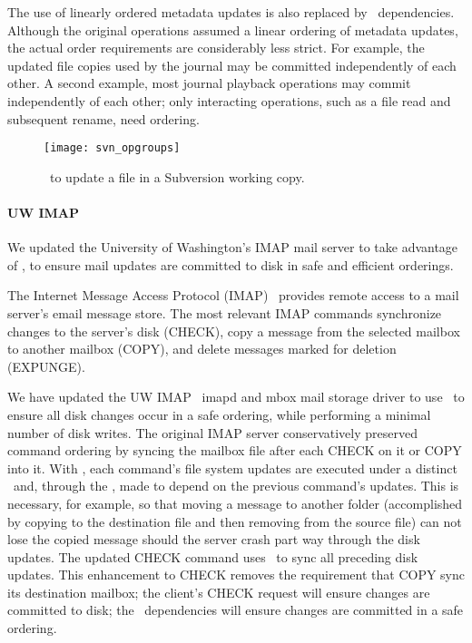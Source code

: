 The use of linearly ordered metadata updates is also replaced by
\opgroup\ dependencies.
%
Although the original operations assumed a linear ordering of metadata
updates, the actual order requirements are considerably less strict.
%
For example, the updated file copies used by the journal may be
committed independently of each other.
%
A second example, most journal playback operations may commit
independently of each other; only interacting operations, such as a
file read and subsequent rename, need ordering.

\begin{figure}[htb]
  \centering
  \texttt{[image: svn\_opgroups]}
  \caption{\Opgroups\ to update a file in a Subversion working copy.}
  \label{fig:svn-order}
\end{figure}

\paragraph{UW IMAP}
\label{sec:opgroup:uwimap}

We updated the University of Washington's IMAP mail server to take
advantage of \opgroups, to ensure mail updates are committed to disk
in safe and efficient orderings.

The Internet Message Access Protocol (IMAP)~\cite{rfc3501} provides
remote access to a mail server's email message store.
%
The most relevant IMAP commands synchronize changes to the server's
disk (CHECK), copy a message from the selected mailbox to another
mailbox (COPY), and delete messages marked for deletion (EXPUNGE).

We have updated the UW IMAP~\cite{uwimap} imapd and mbox mail storage
driver to use \opgroups\ to ensure all disk changes occur in a safe
ordering, while performing a minimal number of disk writes.
%
The original IMAP server conservatively preserved command ordering by
syncing the mailbox file after each CHECK on it or COPY into it. With
\opgroups, each command's file system updates are executed under a
distinct \opgroup\ and, through the \opgroup, made to depend on the
previous command's updates. This is necessary, for example, so that
moving a message to another folder (accomplished by copying to the
destination file and then removing from the source file) can not lose
the copied message should the server crash part way through the disk
updates.
%
The updated CHECK command uses \pgSync\ to sync all preceding disk
updates. This enhancement to CHECK removes the requirement that COPY
sync its destination mailbox; the client's CHECK request will ensure
changes are committed to disk; the \opgroup\ dependencies will ensure
changes are committed in a safe ordering.

